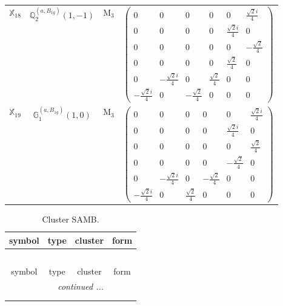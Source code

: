 \documentclass[fleqn,10pt,landscape]{article}
\begin{document}
\begin{itemize}
\begin{center}
\begin{longtable}{c|c|c|c}
$ \mathbb{X}_{18} $ & $\mathbb{Q}_{2}^{(a,B_{1g})}(1,-1)$ & M$_{3}$ & $\begin{pmatrix} 0 & 0 & 0 & 0 & 0 & \frac{\sqrt{2} i}{4} \\ 0 & 0 & 0 & 0 & \frac{\sqrt{2} i}{4} & 0 \\ 0 & 0 & 0 & 0 & 0 & - \frac{\sqrt{2}}{4} \\ 0 & 0 & 0 & 0 & \frac{\sqrt{2}}{4} & 0 \\ 0 & - \frac{\sqrt{2} i}{4} & 0 & \frac{\sqrt{2}}{4} & 0 & 0 \\ - \frac{\sqrt{2} i}{4} & 0 & - \frac{\sqrt{2}}{4} & 0 & 0 & 0 \end{pmatrix}$ \\
$ \mathbb{X}_{19} $ & $\mathbb{G}_{1}^{(a,B_{1g})}(1,0)$ & M$_{3}$ & $\begin{pmatrix} 0 & 0 & 0 & 0 & 0 & \frac{\sqrt{2} i}{4} \\ 0 & 0 & 0 & 0 & \frac{\sqrt{2} i}{4} & 0 \\ 0 & 0 & 0 & 0 & 0 & \frac{\sqrt{2}}{4} \\ 0 & 0 & 0 & 0 & - \frac{\sqrt{2}}{4} & 0 \\ 0 & - \frac{\sqrt{2} i}{4} & 0 & - \frac{\sqrt{2}}{4} & 0 & 0 \\ - \frac{\sqrt{2} i}{4} & 0 & \frac{\sqrt{2}}{4} & 0 & 0 & 0 \end{pmatrix}$ \\
\end{longtable}
\end{center}
\begin{center}
\renewcommand{\arraystretch}{1.3}
\begin{longtable}{c|c|c|c}
\caption{Cluster SAMB.}
 \\
 \hline \hline
symbol & type & cluster & form \\ \hline \endfirsthead

\multicolumn{3}{l}{\tablename\ \thetable{}} \\
 \hline \hline
symbol & type & cluster & form \\ \hline \endhead

 \hline \hline
\multicolumn{3}{r}{\footnotesize\it continued ...} \\ \endfoot

 \hline \hline
\multicolumn{3}{r}{} \\ \endlastfoot


\end{longtable}
\end{center}
\end{itemize}
\end{document}
